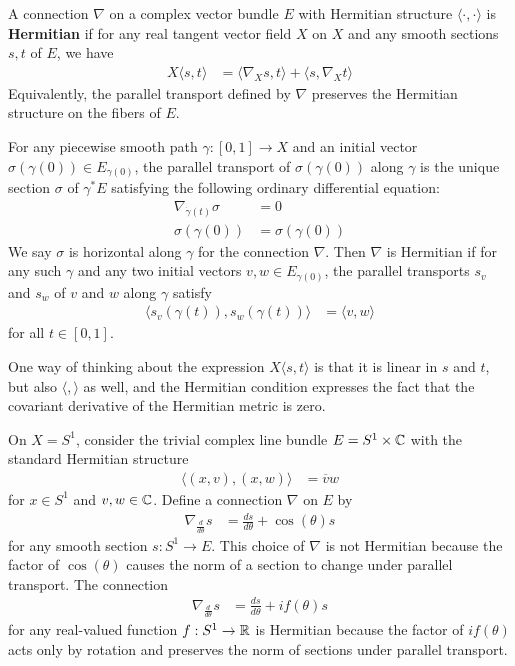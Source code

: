 \documentclass[12pt]{article}
\begin{document}
\begin{definition}
    A connection $\nabla$ on a complex vector bundle $E$ with Hermitian structure $\langle \cdot, \cdot \rangle$ is \textbf{Hermitian} if for any real tangent vector field $X$ on $X$ and any smooth sections $s, t$ of $E$, we have \begin{align*}
        X \langle s, t \rangle & = \langle \nabla_X s, t \rangle + \langle s, \nabla_X t \rangle
    \end{align*} Equivalently, the parallel transport defined by $\nabla$ preserves the Hermitian structure on the fibers of $E$. 
    
For any piecewise smooth path $\gamma: [0,1] \to X$ and an initial vector $\sigma(\gamma(0)) \in E_{\gamma(0)}$, the parallel transport of $\sigma(\gamma(0))$ along $\gamma$ is the unique section $\sigma$ of $\gamma^* E$ satisfying the following ordinary differential equation:
    \begin{align*}
        \nabla_{\dot \gamma(t)} \sigma & = 0 \\
        \sigma(\gamma(0)) & = \sigma(\gamma(0))
    \end{align*} We say $\sigma$ is horizontal along $\gamma$ for the connection $\nabla$. Then $\nabla$ is Hermitian if for any such $\gamma$ and any two initial vectors $v, w \in E_{\gamma(0)}$, the parallel transports $s_v$ and $s_w$ of $v$ and $w$ along $\gamma$ satisfy \begin{align*}
        \langle s_v(\gamma(t)), s_w(\gamma(t)) \rangle
    & = \langle v, w \rangle
    \end{align*} for all $t \in [0,1]$.
\end{definition}
One way of thinking about the expression $X \langle s, t \rangle$ is that it is linear in $s$ and $t$, but also $\langle, \rangle$ as well, and the Hermitian condition expresses the fact that the covariant derivative of the Hermitian metric is zero.

\begin{example}
    On $X = S^1$, consider the trivial complex line bundle $E = S^1 \times \mathbb{C}$ with the standard Hermitian structure \begin{align*}
        \langle (x, v), (x, w) \rangle & = \overline{v} w
    \end{align*} for $x \in S^1$ and $v, w \in \mathbb{C}$. Define a connection $\nabla$ on $E$ by \begin{align*}
        \nabla_{\frac{d}{d\theta}} s & = \frac{d s}{d\theta} + \cos(\theta) s
    \end{align*} for any smooth section $s: S^1 \to E$. This choice of $\nabla$ is not Hermitian because the factor of $\cos(\theta)$ causes the norm of a section to change under parallel transport. The connection \begin{align*}
        \nabla_{\frac{d}{d\theta}} s & = \frac{d s}{d\theta} + i f(\theta) s
    \end{align*} for any real-valued function $f: S^1 \to \mathbb{R}$ is Hermitian because the factor of $i f(\theta)$ acts only by rotation and preserves the norm of sections under parallel transport.
\end{example}
\end{document}
